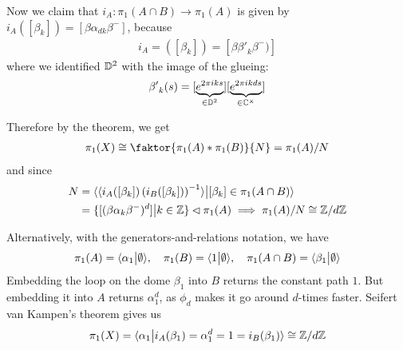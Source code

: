 \begin{ex}
  Now we claim that $i_A: \pi_1(A \cap B) \to \pi_1(A)$ is given by $i_A([\beta_k]) = [\beta \alpha_{dk}\beta^{-}]$, because
  \begin{align*}
    i_A = ([\beta_k]) = [\beta {\beta'}_k \beta^{-})]
  \end{align*}
  where we identified $\mathbb{D}^{2}$ with the image of the glueing:
  \begin{align*}
    {\beta'}_k(s) = [\underbrace{e^{2 \pi i k s}}_{\in \mathbb{D}^{2}}] [\underbrace{e^{2 \pi i k d s}}_{\in \mathbb{C}^{\times}}]
  \end{align*}

  Therefore by the theorem, we get
  \begin{align*}
    \pi_1(X) \iso \faktor{\pi_1(A) \ast \pi_1(B)}{N} = \pi_1(A)/N
  \end{align*}
  and since
  \begin{align*}
    N 
    &= 
    \langle\langle i_A([\beta_k]) \left(
          i_B([\beta_k])
    \right)^{-1}\rangle \big\vert [\beta_k] \in \pi_1(A \cap B) \rangle\\
    &=\{[(\beta \alpha_k \beta^{-})^{d}] \big\vert k \in \mathbb{Z}\} \lhd \pi_1(A) \implies \pi_1(A)/N \cong \mathbb{Z}/d\mathbb{Z}
  \end{align*}


  Alternatively, with the generators-and-relations notation, we have
  \begin{align*}
    \pi_1(A) = \langle\alpha_1\big\vert \emptyset\rangle 
    , \quad
    \pi_1(B) = \langle1 \big\vert \emptyset\rangle
    ,\quad
    \pi_1(A \cap B) = \langle\beta_1\big\vert \emptyset\rangle
  \end{align*}
  Embedding the loop on the dome $\beta_1$ into $B$ returns the constant path $1$.
  But embedding it into $A$ returns $\alpha_1^{d}$, as $\phi_d$ makes it go around $d$-times faster.
  Seifert van Kampen's theorem gives us
  \begin{align*}
    \pi_1(X) = \langle\alpha_1 \big\vert i_A(\beta_1) = \alpha_1^{d} = 1 = i_B(\beta_1)\rangle \cong \mathbb{Z}/d\mathbb{Z}
  \end{align*}
\end{ex}

